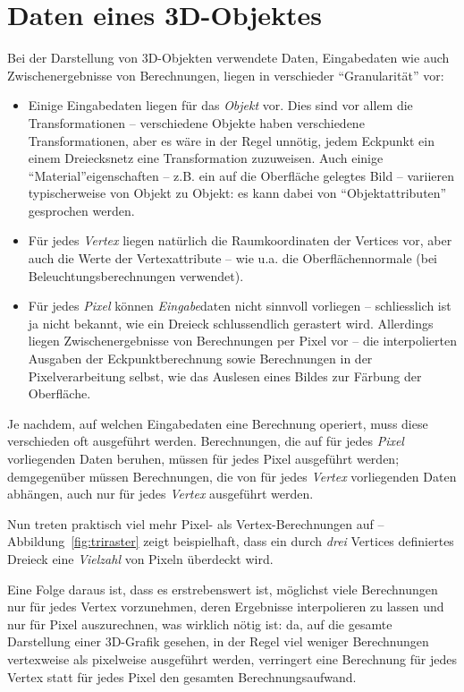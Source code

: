 \documentclass[twoside,a4paper,fleqn,12pt]{book}
\begin{document}
\section{Daten eines 3D-Objektes}
\label{object_data}

Bei der Darstellung von 3D-Objekten verwendete Daten, Eingabedaten wie auch Zwischenergebnisse von Berechnungen,
liegen in verschieder "`Granularität"' vor:

\begin{itemize}
\item Einige Eingabedaten liegen für das \emph{Objekt} vor.
Dies sind vor allem die Transformationen -- verschiedene Objekte haben verschiedene Transformationen,
aber es wäre in der Regel unnötig, jedem Eckpunkt ein einem Dreiecksnetz eine Transformation zuzuweisen.
Auch einige "`Material"'eigenschaften -- z.B. ein auf die Oberfläche gelegtes Bild -- variieren typischerweise von Objekt zu Objekt:
es kann dabei von "`Objektattributen"' gesprochen werden.
\item Für jedes \emph{Vertex} liegen natürlich die Raumkoordinaten der Vertices vor, aber auch 
die Werte der Vertexattribute -- wie u.a. die Oberflächennormale (bei Beleuchtungsberechnungen verwendet).
\item Für jedes \emph{Pixel} können \emph{Eingabe}daten nicht sinnvoll vorliegen -- schliesslich ist ja nicht bekannt, wie ein Dreieck
schlussendlich gerastert wird. Allerdings liegen Zwischenergebnisse von Berechnungen per Pixel vor -- die  interpolierten Ausgaben der
Eckpunktberechnung sowie Berechnungen in der Pixelverarbeitung selbst, wie das Auslesen eines Bildes
zur Färbung der Oberfläche.
\end{itemize}

Je nachdem, auf welchen Eingabedaten eine Berechnung operiert, muss diese verschieden oft ausgeführt werden.
Berechnungen, die auf für jedes \emph{Pixel} vorliegenden Daten beruhen, müssen für jedes Pixel ausgeführt werden;
demgegenüber müssen Berechnungen, die von für jedes \emph{Vertex} vorliegenden Daten abhängen,
auch nur für jedes \emph{Vertex} ausgeführt werden.

Nun treten praktisch viel mehr Pixel- als Vertex-Berechnungen auf -- Abbildung~\ref{fig:triraster} zeigt beispielhaft,
dass ein durch \emph{drei} Vertices definiertes Dreieck eine \emph{Vielzahl} von Pixeln überdeckt wird.

Eine Folge daraus ist, dass es erstrebenswert ist, möglichst viele Berechnungen nur für jedes Vertex vorzunehmen, deren Ergebnisse interpolieren zu lassen
und nur für Pixel auszurechnen, was wirklich nötig ist: da, auf die gesamte Darstellung einer 3D-Grafik gesehen,
in der Regel viel weniger Berechnungen vertexweise als pixelweise ausgeführt werden, verringert eine Berechnung für jedes Vertex statt für jedes Pixel
den gesamten Berechnungsaufwand.
\end{document}
